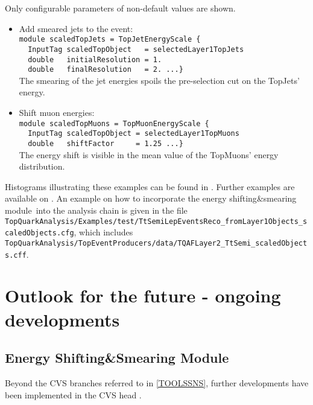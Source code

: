 \documentclass{cmspaper}
\newcommand{\SnS}{Energy Shifting{\&}Smearing Module}
\newcommand{\sns}{energy shifting{\&}smearing module}
\begin{document}
\begin{description}
      Only configurable parameters of non-default values are shown.
      \begin{itemize}
       \item Add smeared jets to the event:\\
        \verb!module scaledTopJets = TopJetEnergyScale {!\\
        \verb!  InputTag scaledTopObject   = selectedLayer1TopJets!\\
        \verb!  double   initialResolution = 1.!\\
        \verb!  double   finalResolution   = 2. ...}!\\
        The smearing of the jet energies spoils the pre-selection cut on the TopJets' energy.
       \item Shift muon energies:\\
        \verb!module scaledTopMuons = TopMuonEnergyScale {!\\
        \verb!  InputTag scaledTopObject = selectedLayer1TopMuons!\\
        \verb!  double   shiftFactor     = 1.25 ...}!\\
        The energy shift is visible in the mean value of the TopMuons' energy distribution.
      \end{itemize}
      Histograms illustrating these examples can be found in \cite{Adler:2007a}. Further examples are available on \cite{Adler:2007c}.
      An example on how to incorporate the \sns\ into the analysis chain is given in the file {\tt TopQuarkAnalysis/Examples/test/TtSemiLepEventsReco\_fromLayer1Objects\_scaledObjects.cfg}, which includes {\tt TopQuarkAnalysis/TopEventProducers/data/TQAFLayer2\_TtSemi\_scaledObjects.cff}.

    \end{description}
    

\section{Outlook for the future - ongoing developments} \label{sec:future}

 \subsection{\SnS } \label{FUTSNS}

  Beyond the CVS branches referred to in \ref{TOOLSSNS}, further developments have been implemented in the CVS head \cite{Adler:2007b,Adler:2007c}.
\end{document}
